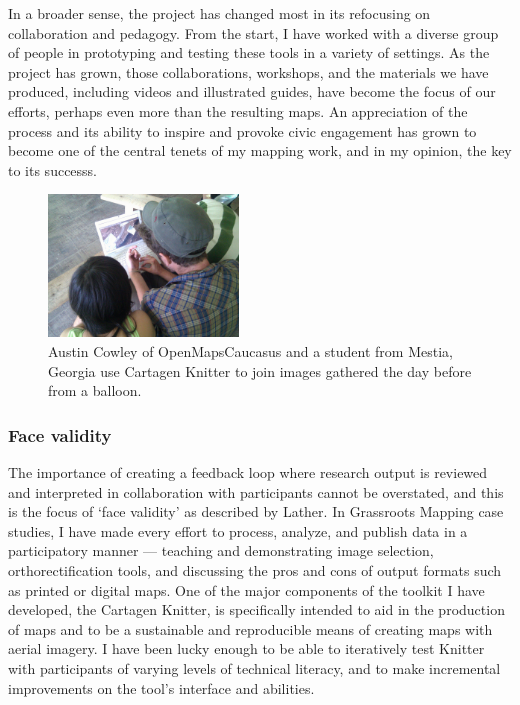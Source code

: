 \documentclass[11pt,oneside,notitlepage]{report}
\begin{document}
{{In a broader sense, the project has changed most in its refocusing on collaboration and pedagogy. From the start, I have worked with a diverse group of people in prototyping and testing these tools in a variety of settings. As the project has grown, those collaborations, workshops, and the materials we have produced, including videos and illustrated guides, have become the focus of our efforts, perhaps even more than the resulting maps. An appreciation of the process and its ability to inspire and provoke civic engagement has grown to become one of the central tenets of my mapping work, and in my opinion, the key to its successs. 

\begin{figure}
  \begin{flushright}
	\includegraphics[width=0.45\textwidth]{images/knitter-mestia.jpg} 
	\caption{Austin Cowley of OpenMapsCaucasus and a student from Mestia, Georgia use Cartagen Knitter to join images gathered the day before from a balloon.}
  \end{flushright}
\end{figure}

\subsubsection{Face validity}

The importance of creating a feedback loop where research output is reviewed and interpreted in collaboration with participants cannot be overstated, and this is the focus of `face validity' as described by Lather. In Grassroots Mapping case studies, I have made every effort to process, analyze, and publish data in a participatory manner --- teaching and demonstrating image selection, orthorectification tools, and discussing the pros and cons of output formats such as printed or digital maps. One of the major components of the toolkit I have developed, the Cartagen Knitter, is specifically intended to aid in the production of maps and to be a sustainable and reproducible means of creating maps with aerial imagery. I have been lucky enough to be able to iteratively test Knitter with participants of varying levels of technical literacy, and to make incremental improvements on the tool's interface and abilities.  

}}
\end{document}
